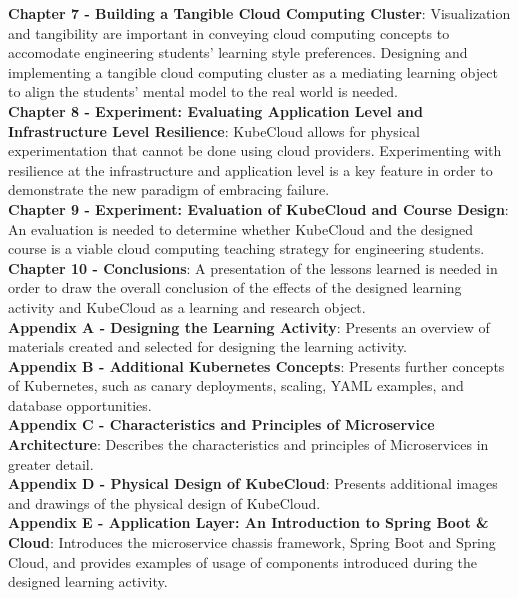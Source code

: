 \noindent\textbf{Chapter 7 - Building a Tangible Cloud Computing Cluster}: Visualization and tangibility are important in conveying cloud computing concepts to accomodate engineering students' learning style preferences. Designing and implementing a tangible cloud computing cluster as a mediating learning object to align the students' mental model to the real world is needed.\\

\noindent\textbf{Chapter 8 - Experiment: Evaluating Application Level and Infrastructure Level Resilience}: KubeCloud allows for physical experimentation that cannot be done using cloud providers. Experimenting with resilience at the infrastructure and application level is a key feature in order to demonstrate the new paradigm of embracing failure. \\

\noindent\textbf{Chapter 9 - Experiment: Evaluation of KubeCloud and Course Design}: An evaluation is needed to determine whether KubeCloud and the designed course is a viable cloud computing teaching strategy for engineering students. \\

\noindent\textbf{Chapter 10 - Conclusions}: A presentation of the lessons learned is needed in order to draw the overall conclusion of the effects of the designed learning activity and KubeCloud as a learning and research object. \\

\noindent\textbf{Appendix A - Designing the Learning Activity}: Presents an overview of materials created and selected for designing the learning activity.  \\

\noindent\textbf{Appendix B - Additional Kubernetes Concepts}: Presents further concepts of Kubernetes, such as canary deployments, scaling, YAML examples, and database opportunities. \\

\noindent\textbf{Appendix C - Characteristics and Principles of Microservice Architecture}: Describes the characteristics and principles of Microservices in greater detail. \\

\noindent\textbf{Appendix D - Physical Design of KubeCloud}: Presents additional images and drawings of the physical design of KubeCloud. \\

\noindent\textbf{Appendix E - Application Layer: An Introduction to Spring Boot \& Cloud}: Introduces the microservice chassis framework, Spring Boot and Spring Cloud, and provides examples of usage of components introduced during the designed learning activity.\\

